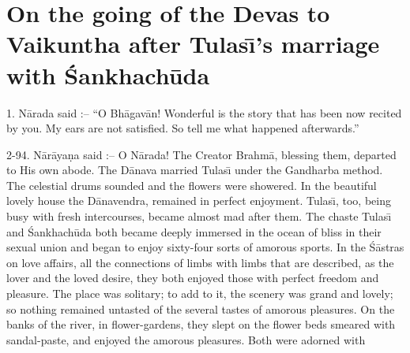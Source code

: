 \chapter{On the going of the Devas to Vaikuntha after Tulas\={\i}'s marriage with \'Sankhach\=uda}

1. N\=arada said :-- ``O Bh\=agav\=an! Wonderful is the story that has been now recited by you. My ears are not satisfied. So tell me what happened afterwards.''

2-94. N\=ar\=aya\d{n}a said :-- O N\=arada! The Creator Brahm\=a, blessing them, departed to His own abode. The D\=anava married Tulas\={\i} under the Gandharba method. The celestial drums sounded and the flowers were showered. In the beautiful lovely house the D\=anavendra, remained in perfect enjoyment. Tulas\={\i}, too, being busy with fresh intercourses, became almost mad after them. The chaste Tulas\={\i} and \'Sankhach\=uda both became deeply immersed in the ocean of bliss in their sexual union and began to enjoy sixty-four sorts of amorous sports. In the \'S\=astras on love affairs, all the connections of limbs with limbs that are described, as the lover and the loved desire, they both enjoyed those with perfect freedom and pleasure. The place was solitary; to add to it, the scenery was grand and lovely; so nothing remained untasted of the several tastes of amorous pleasures. On the banks of the river, in flower-gardens, they slept on the flower beds smeared with sandal-paste, and enjoyed the amorous pleasures. Both were adorned with

